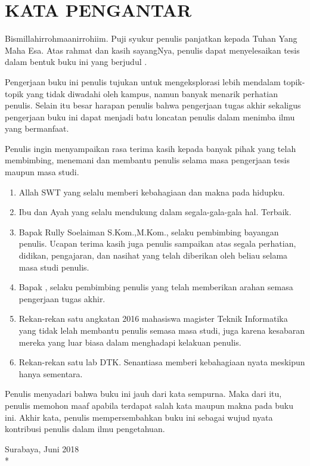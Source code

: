 \chapter {KATA PENGANTAR}

Bismillahirrohmaanirrohiim. Puji syukur penulis panjatkan kepada Tuhan Yang Maha Esa. Atas rahmat dan kasih sayangNya, penulis dapat menyelesaikan tesis dalam bentuk buku ini yang berjudul \textbf{\judul}.

Pengerjaan buku ini penulis tujukan untuk mengeksplorasi lebih mendalam topik-topik yang tidak diwadahi oleh kampus, namun banyak menarik perhatian penulis. Selain itu besar harapan penulis bahwa pengerjaan tugas akhir sekaligus pengerjaan buku ini dapat menjadi batu loncatan penulis dalam menimba ilmu yang bermanfaat.

Penulis ingin menyampaikan rasa terima kasih kepada banyak pihak yang telah membimbing, menemani dan membantu penulis selama masa pengerjaan tesis maupun masa studi.

\begin {enumerate}
	\item Allah SWT yang selalu memberi kebahagiaan dan makna pada hidupku.
  \item Ibu dan Ayah yang selalu mendukung dalam segala-gala-gala hal. Terbaik.
  \item Bapak Rully Soelaiman S.Kom.,M.Kom., selaku pembimbing bayangan penulis. Ucapan terima kasih juga penulis sampaikan atas segala perhatian, didikan, pengajaran, dan nasihat yang telah diberikan oleh beliau selama masa studi penulis.
  \item Bapak \pembimbingsatu, selaku pembimbing penulis yang telah memberikan arahan semasa pengerjaan tugas akhir.
  \item Rekan-rekan satu angkatan 2016 mahasiswa magister Teknik Informatika yang tidak lelah membantu penulis semasa masa studi, juga karena kesabaran mereka yang luar biasa dalam menghadapi kelakuan penulis.
  \item Rekan-rekan satu lab DTK. Senantiasa memberi kebahagiaan nyata meskipun hanya sementara.
\end {enumerate}

Penulis menyadari bahwa buku ini jauh dari kata sempurna. Maka dari itu, penulis memohon maaf apabila terdapat salah kata maupun makna pada buku ini. Akhir kata, penulis mempersembahkan buku ini sebagai wujud nyata kontribusi penulis dalam ilmu pengetahuan.

\begin{flushright}
Surabaya, Juni 2018 \\*
\vspace{5em}
\penulis
\end{flushright}